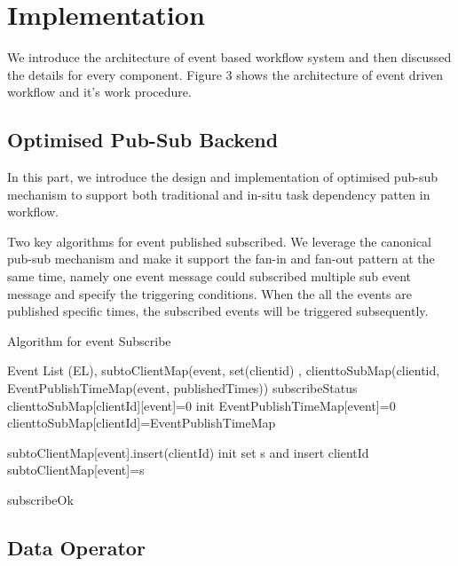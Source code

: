 

\section{Implementation}
We introduce the architecture of event based workflow system and then discussed the details for every component. Figure 3 shows the architecture of  event driven workflow and it's work procedure.


\subsection{Optimised Pub-Sub Backend}

In this part, we introduce the design and implementation of optimised pub-sub mechanism to support both traditional and in-situ task dependency patten in workflow.

Two key algorithms for event published subscribed. We leverage the canonical pub-sub mechanism and make it support the fan-in and fan-out pattern at the same time, namely one event message could subscribed multiple sub event message and specify the triggering conditions. When the all the events are published specific times, the subscribed events will be triggered subsequently.


 \begin{algorithm}
 \caption{Algorithm for event Subscribe}
 \begin{algorithmic}[1]
 \renewcommand{\algorithmicrequire}{\textbf{Input:}}
 \renewcommand{\algorithmicensure}{\textbf{Output:}}
 \REQUIRE 
 Event List (EL), subtoClientMap(event, set(clientid) , clienttoSubMap(clientid, EventPublishTimeMap(event, publishedTimes))
 \ENSURE  subscribeStatus
  \STATE clienttoSubMap[clientId][event]=0
  \ELSE
  \STATE init EventPublishTimeMap[event]=0
  \STATE clienttoSubMap[clientId]=EventPublishTimeMap
  \ENDIF


   \STATE subtoClientMap[event].insert(clientId)
  \ELSE
   \STATE init set s and insert clientId
   \STATE subtoClientMap[event]=s
  \ENDIF

 \ENDFOR

 \RETURN subscribeOk
 \end{algorithmic} 
 \end{algorithm}



\subsection{Data Operator}



